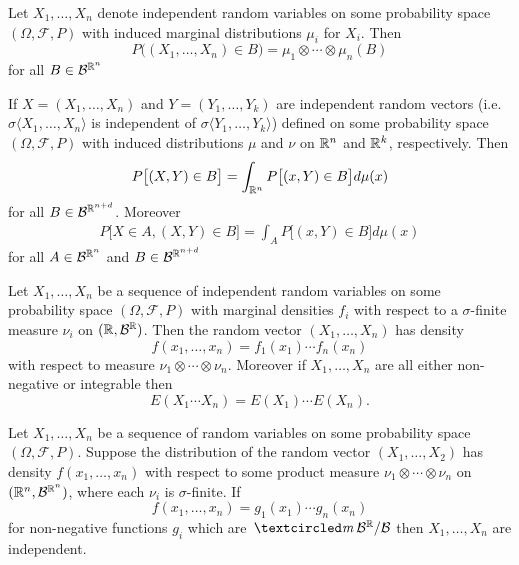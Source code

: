 



\begin{theorem}
Let $X_1,\ldots, X_n$ denote independent random variables on some probability space $(\Omega, \mathcal F, P)$ with  induced marginal distributions $\mu_i$ for $X_i$. Then
\[ P\bigl((X_1,\ldots,X_n) \in B\bigr) =\mu_1\otimes \cdots \otimes \mu_n(B)\]
for all $B\in \mathcal B^{\Bbb R^n}$
\end{theorem}

\begin{theorem}
\label{thm: Law of total probability}
If $X=(X_1,\ldots, X_n)$ and $Y=(Y_1,\ldots, Y_k)$ are independent random vectors (i.e. $\sigma\langle X_1,\ldots,X_n\rangle$ is independent of $\sigma\langle Y_1,\ldots, Y_k \rangle$) defined on some probability space $(\Omega, \mathcal F, P)$ with induced distributions $\mu$ and $\nu$ on $\Bbb R^n$ and $\Bbb R^k$, respectively. Then
\begin{align*}
P\bigl[(X,Y)\in B\bigr]=\int_{\Bbb R^n} P\bigl[(x,Y)\in B\bigr] d\mu(x)
\end{align*}
 for all $B\in\mathcal B^{\Bbb R^{n+d}}$. Moreover
 \begin{align*}
P\bigl[X\in A,(X,Y)\in B\bigr]=\int_{A} P\bigl[(x,Y)\in B\bigr] d\mu(x)
\end{align*}
 for all $A\in \mathcal B^{\Bbb R^{n}}$ and $B\in\mathcal B^{\Bbb R^{n+d}}$
\end{theorem}

\begin{theorem}
Let $X_1,\ldots, X_n$ be a sequence of independent random variables on some probability space $(\Omega, \mathcal F, P)$ with marginal densities $f_i$ with respect to a $\sigma$-finite measure $\nu_i$ on $(\Bbb R, \mathcal B^{\Bbb R})$. Then the random vector $(X_1,\ldots, X_n)$ has density
\[ f(x_1,\ldots, x_n)=f_1(x_1)\cdots f_n(x_n) \]
with respect to measure $\nu_1\otimes \cdots\otimes \nu_n$. Moreover
 if $X_1,\ldots, X_n$ are all either non-negative or integrable then
 \[ E(X_1\cdots X_n)=E(X_1)\cdots E(X_n). \]
 \end{theorem}

 \begin{theorem}
 Let $X_1,\ldots, X_n$ be a sequence of random variables on some probability space $(\Omega, \mathcal F, P)$. Suppose the distribution of the random vector $(X_1,\ldots, X_2)$ has density $f(x_1,\ldots, x_n)$ with respect to some product measure $\nu_1\otimes \cdots \otimes \nu_n$ on $(\Bbb R^n,\mathcal B^{\Bbb R^n})$, where each $\nu_i$ is $\sigma$-finite. If
 \[ f(x_1,\ldots, x_n)=g_1(x_1)\cdots g_n(x_n) \]
for non-negative functions $g_i$ which are $\mcirc \mathcal B^{\Bbb R}/\mathcal B$ then $X_1,\ldots, X_n$ are independent.
 \end{theorem}




